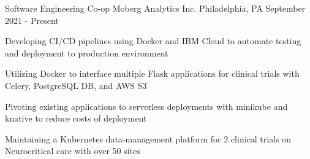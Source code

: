 

\begin{cventries}

  
	\cventry
	{Software Engineering Co-op}
	{Moberg Analytics Inc.}
	{Philadelphia, PA}
	{September 2021 - Present}
	{\begin{cvitems}
		\item {Developing CI/CD pipelines using Docker and IBM Cloud to automate testing and deployment to production environment}
		\item {Utilizing Docker to interface multiple Flask applications for clinical trials with Celery, PostgreSQL DB, and AWS S3}
		\item {Pivoting existing applications to serverless deployments with minikube and knative to reduce costs of deployment}
		\item {Maintaining a Kubernetes data-management platform for 2 clinical trials on Neurocritical care with over 50 sites}
		\end{cvitems}}
	


\end{cventries}
